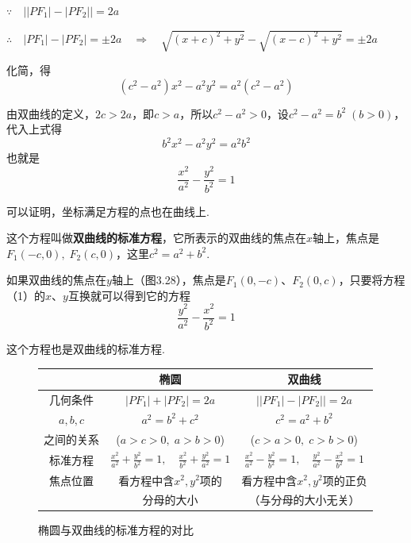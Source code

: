 $\because\quad \Big||PF_1|-|PF_2|\Big|=2a$

$\therefore\quad |PF_1|-|PF_2|=\pm 2a\quad \Rightarrow\quad \sqrt{(x+c)^2+y^2}-\sqrt{(x-c)^2+y^2}=\pm 2a$

化简，得
\[(c^2-a^2)x^2-a^2y^2=a^2(c^2-a^2)\]

由双曲线的定义，$2c>2a$，即$c>a$，所以$c^2-a^2>0$，设$c^2-a^2=b^2\; (b>0)$，代入上式得
\[b^2x^2-a^2y^2=a^2b^2\]
也就是
\begin{equation}
    \frac{x^2}{a^2}-\frac{y^2}{b^2}=1 \tag{1}
\end{equation}

可以证明，坐标满足方程的点也在曲线上.


\noindent
\begin{minipage}{.52\textwidth}
\CTEXindent

这个方程叫做\textbf{双曲线的标准方程}，它所表示的双曲线的焦点在$x$轴上，焦点是$F_1(-c,0),\; F_2(c,0)$，这里$c^2=a^2+b^2$.

如果双曲线的焦点在$y$轴上（图3.28），焦点是$F_1(0,-c)$、$F_2(0,c)$，只要将方程（1）的$x$、$y$互换就可以得到它的方程
\[\frac{y^2}{a^2}-\frac{x^2}{b^2}=1\]

这个方程也是双曲线的标准方程.
\end{minipage}
\hfill
\begin{minipage}{.45\textwidth}
\centering
{}
\end{minipage}

\begin{figure}[htp]
    \centering
    \caption*{椭圆与双曲线的标准方程的对比}
\begin{tabular}{c|c|c}
    \hline
    & 椭圆 & 双曲线\\
\hline
几何条件 &  $|PF_1|+|PF_2|=2a$    &   $\Big||PF_1|-|PF_2|\Big|=2a$    \\ \hline
$a,b,c$ &   $a^2=b^2+c^2$   &  $c^2=a^2+b^2$     \\
之间的关系 &  ($a>c>0,\; a>b>0$)    &    ($c>a>0,\; c>b>0$)   \\[1.5ex]  \hline
标准方程 &  $\frac{x^2}{a^2}+\frac{y^2}{b^2}=1,\quad \frac{x^2}{b^2}+\frac{y^2}{a^2}=1$    &   $\frac{x^2}{a^2}-\frac{y^2}{b^2}=1,\quad \frac{y^2}{a^2}-\frac{x^2}{b^2}=1$    \\[1.5ex] \hline
焦点位置 &  看方程中含$x^2,y^2$项的    &   看方程中含$x^2,y^2$项的正负    \\
& 分母的大小& （与分母的大小无关）\\
\hline
\end{tabular}
\end{figure}

